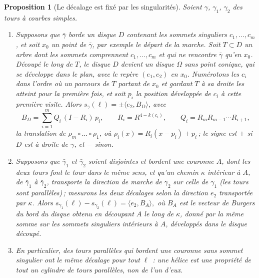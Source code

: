 \documentclass[11pt,a4paper]{article}
\newtheorem{proposition}{Proposition}
\newcommand{\shift}{s}
\begin{document}
\begin{proposition}[Le décalage est fixé par les singularités]\label{prop:burgers}
Soient $\gamma$, $\gamma_1$, $\gamma_2$ des tours à courbes simples.
\begin{enumerate}
\item[(a)] Supposons que $\bar\gamma$ borde un disque $D$ contenant les
  sommets singuliers $c_1, \dots, c_m$, et soit $x_0$ un point de
  $\bar\gamma$, par exemple le départ de la marche. Soit $T \subset D$ un
  arbre dont les sommets comprennent $c_1, \dots, c_m$ et qui ne rencontre
  $\bar\gamma$ qu'en $x_0$. Découpé le long de $T$, le disque $D$ devient un
  disque $\Omega$ sans point conique, qui se développe dans le plan, avec le
  repère $(e_1, e_2)$ en $x_0$. Numérotons les $c_i$ dans l'ordre où un
  parcours de $T$ partant de $x_0$ et gardant $T$ à sa droite les atteint pour
  la première fois, et soit $p_i$ la position développée de $c_i$ à cette
  première visite. Alors $\shift_\gamma(\ell) = \pm\langle e_2, B_D \rangle$,
  avec
  \[
    B_D = \sum_{i=1}^m Q_i\,(I - R_i)\,p_i ,
    \qquad R_i = R^{4 - k(c_i)},
    \qquad Q_i = R_m R_{m-1} \cdots R_{i+1},
  \]
  la translation de $\rho_m \circ \dots \circ \rho_1$, où $\rho_i(x) =
  R_i(x - p_i) + p_i$\,; le signe est $+$ si $D$ est à droite de
  $\bar\gamma$, et $-$ sinon.
\item[(b)] Supposons que $\bar\gamma_1$ et $\bar\gamma_2$ soient disjointes et
  bordent une couronne $A$, dont les deux tours font le tour dans le même
  sens, et qu'un chemin $\kappa$ intérieur à $A$, de $\bar\gamma_1$ à
  $\bar\gamma_2$, transporte la direction de marche de $\gamma_2$ sur celle de
  $\gamma_1$ (les tours sont \emph{parallèles})\,; mesurons les deux
  décalages selon la direction $e_2$ transportée par $\kappa$. Alors
  \(
    \shift_{\gamma_1}(\ell) - \shift_{\gamma_2}(\ell) = \langle e_2, B_A \rangle,
  \)
  où $B_A$ est le vecteur de Burgers du bord du disque obtenu en découpant
  $A$ le long de $\kappa$, donné par la même somme sur les sommets singuliers
  intérieurs à $A$, développés dans le disque découpé.
\item[(c)] En particulier, des tours parallèles qui bordent une couronne sans
  sommet singulier ont le même décalage pour tout $\ell$~: une hélice est une
  propriété de tout un cylindre de tours parallèles, non de l'un d'eux.
\end{enumerate}
\end{proposition}
\end{document}
